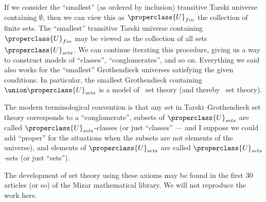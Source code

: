 \begin{node}
\begin{definition}
\begin{node}[Remarks]
If we consider the ``smallest'' (as ordered by inclusion) transitive
Tarski universe containing $\emptyset$, then we can view this as
$\properclass{U}_{fin}$ the collection of finite sets. The ``smallest''
transitive Tarski universe containing $\properclass{U}_{fin}$ may be
viewed as the collection of all sets $\properclass{U}_{sets}$. We can
continue iterating this procedure, giving us a way to construct
models of ``classes'', ``conglomerates'', and so on. Everything we said
also works for the ``smallest'' Grothendieck universes satisfying the
given conditions. In particular, the smallest Grothendieck containing $\union\properclass{U}_{sets}$
is a model of \MK\ set theory (and thereby \NBG\ set theory).

The modern terminological convention is that any set in
Tarski--Grothendieck set theory corresponds to a ``conglomerate'',
subsets of $\properclass{U}_{sets}$ are called
$\properclass{U}_{sets}$-classes (or just ``classes'' --- and I suppose
we could add ``proper'' for the situations when the subsets are not
elements of the universe), and elements of
$\properclass{U}_{sets}$ are called $\properclass{U}_{sets}$-sets (or
just ``sets'').
\end{node}
\end{definition}
\end{node}

\begin{node}\label{tg-000A}%
The development of set theory using these axioms may be found in the
first 30 articles (or so) of the Mizar mathematical library. We will not
reproduce the work here.
\end{node}

